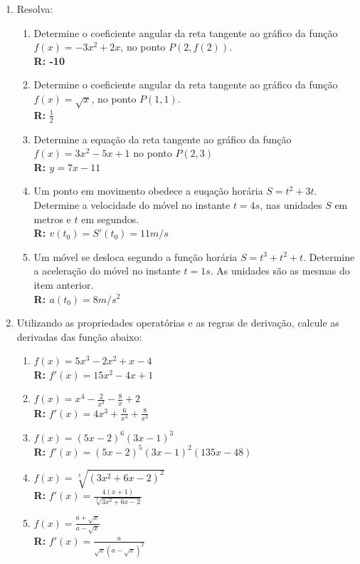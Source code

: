 \documentclass[oneside,a4paper,12pt]{article}
\begin{document}
\begin{enumerate}

	\item Resolva:
        \begin{enumerate}
        \item Determine o coeficiente angular da reta tangente ao gráfico da função $f(x) = -3x^2+2x$, no ponto $P(2,f(2))$. \\\textbf{R: -10}
        \item Determine o coeficiente angular da reta tangente ao gráfico da função $f(x) = \sqrt{x}$, no ponto $P(1,1)$. \\\textbf{R: }$\displaystyle \frac{1}{2}$
        \item Determine a equação da reta tangente ao gráfico da função $f(x) = 3x^2 -5x + 1$ no ponto $P(2,3)$ \\\textbf{R: $y=7x-11$}
        \item Um ponto em movimento obedece a euqação horária $S=t^2+3t$. Determine a velocidade do móvel no instante $t=4s$, nas unidades $S$ em metros e $t$ em segundos. \\\textbf{R: $v(t_0) = S'(t_0) = 11m/s$}
        \item Um móvel se desloca segundo a função horária $S = t^3+t^2+t$. Determine a aceleração do móvel no instante $t=1s$. As unidades são as mesmas do item anterior. \\\textbf{R: $a(t_0) = 8m/s^2$}
        \end{enumerate}
    \item Utilizando as propriedades operatórias e as regras de derivação, calcule as derivadas das função abaixo:
        \begin{enumerate}
         \item $f(x) = 5x^3 - 2x^2 + x - 4$ \\\textbf{R:} $f'(x) = 15x^2 - 4x + 1$
         \item $f(x) = x^4 - \displaystyle \frac{2}{x^3} - \frac{8}{x} + 2$ \\\textbf{R:} $f'(x) = 4x^3 + \displaystyle \frac{6}{x^4} + \frac{8}{x^2}$
         \item $f(x) = (5x - 2)^6(3x-1)^3$ \\\textbf{R:} $f'(x) = (5x-2)^5(3x-1)^2(135x-48)$
         \item $f(x) = \displaystyle \sqrt[3]{(3x^2+6x-2)^2}$ \\\textbf{R:} $f'(x) = \displaystyle \frac{4(x+1)}{\sqrt[3]{3x^2+6x-2}}$
         \item $f(x) = \displaystyle \frac{a + \sqrt{x}}{a - \sqrt{x}}$ \\\textbf{R: } $f'(x) = \displaystyle \frac{a}{\sqrt{x}(a - \sqrt{x})^2}$

\end{enumerate}
\end{enumerate}
\end{document}
